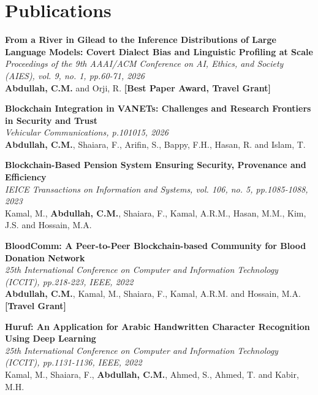 \documentclass[letterpaper,11pt]{article}
\begin{document}
\section{Publications}
  \begin{enumerate}[leftmargin=0.25in, label={[\arabic*]}]
    \small{
    \item \textbf{From a River in Gilead to the Inference Distributions of Large Language Models: Covert Dialect Bias and Linguistic Profiling at Scale} \\
      \textit{Proceedings of the 9th AAAI/ACM Conference on AI, Ethics, and Society (AIES), vol. 9, no. 1, pp.60-71, 2026} \\
      \textbf{Abdullah, C.M.} and Orji, R. \textbf{[Best Paper Award, Travel Grant]}
      \vspace{2pt}

      \item \textbf{Blockchain Integration in VANETs: Challenges and Research Frontiers in Security and Trust} \\
      \textit{Vehicular Communications, p.101015, 2026} \\
      \textbf{Abdullah, C.M.}, Shaiara, F., Arifin, S., Bappy, F.H., Hasan, R. and Islam, T.
      \vspace{2pt}

      \item \textbf{Blockchain-Based Pension System Ensuring Security, Provenance and Efficiency} \\
      \textit{IEICE Transactions on Information and Systems, vol. 106, no. 5, pp.1085-1088, 2023} \\
      Kamal, M., \textbf{Abdullah, C.M.}, Shaiara, F., Kamal, A.R.M., Hasan, M.M., Kim, J.S. and Hossain, M.A.
      \vspace{2pt}

      \item \textbf{BloodComm: A Peer-to-Peer Blockchain-based Community for Blood Donation Network} \\
      \textit{25th International Conference on Computer and Information Technology (ICCIT), pp.218-223, IEEE, 2022} \\
      \textbf{Abdullah, C.M.}, Kamal, M., Shaiara, F., Kamal, A.R.M. and Hossain, M.A. \textbf{[Travel Grant]}
      \vspace{2pt}

      \item \textbf{Huruf: An Application for Arabic Handwritten Character Recognition Using Deep Learning} \\
      \textit{25th International Conference on Computer and Information Technology (ICCIT), pp.1131-1136, IEEE, 2022} \\
      Kamal, M., Shaiara, F., \textbf{Abdullah, C.M.}, Ahmed, S., Ahmed, T. and Kabir, M.H.
    }
  \end{enumerate}
\end{document}
